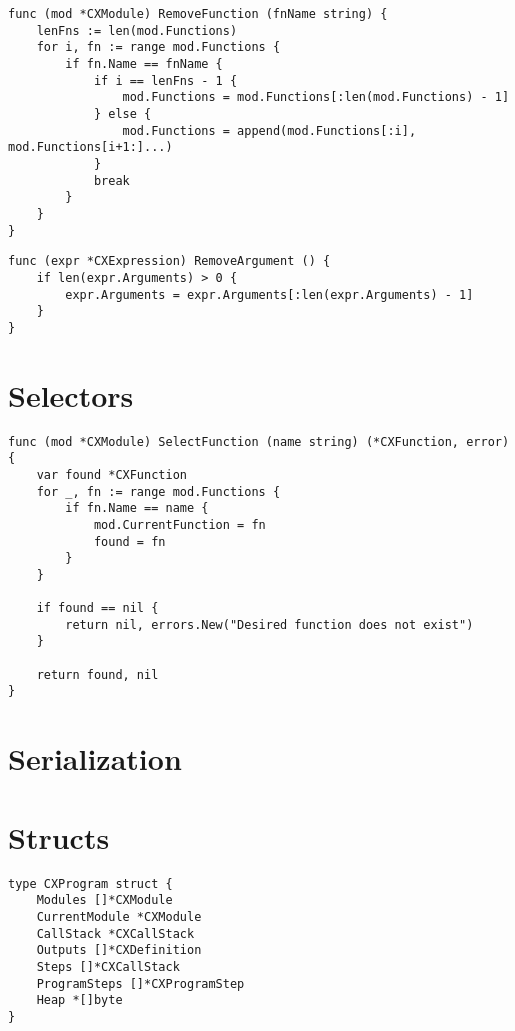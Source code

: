 \begin{lstlisting}[float=*, caption=Example of a Remover]
func (mod *CXModule) RemoveFunction (fnName string) {
	lenFns := len(mod.Functions)
	for i, fn := range mod.Functions {
		if fn.Name == fnName {
			if i == lenFns - 1 {
				mod.Functions = mod.Functions[:len(mod.Functions) - 1]
			} else {
				mod.Functions = append(mod.Functions[:i], mod.Functions[i+1:]...)
			}
			break
		}
	}
}
\end{lstlisting}

\begin{lstlisting}[float=*, caption=Example of a Remover]
func (expr *CXExpression) RemoveArgument () {
	if len(expr.Arguments) > 0 {
		expr.Arguments = expr.Arguments[:len(expr.Arguments) - 1]
	}
}
\end{lstlisting}

\section{Selectors}
\label{implementation-selectors}

\begin{lstlisting}[float=*, caption=Example of a Getter]
func (mod *CXModule) SelectFunction (name string) (*CXFunction, error) {
	var found *CXFunction
	for _, fn := range mod.Functions {
		if fn.Name == name {
			mod.CurrentFunction = fn
			found = fn
		}
	}

	if found == nil {
		return nil, errors.New("Desired function does not exist")
	}

	return found, nil
}
\end{lstlisting}

\section{Serialization}
\label{implementation-serialization}



\section{Structs}
\label{implementation-structs}

\begin{lstlisting}[float=*, caption=Example of a Struct]
type CXProgram struct {
	Modules []*CXModule
	CurrentModule *CXModule
	CallStack *CXCallStack
	Outputs []*CXDefinition
	Steps []*CXCallStack
	ProgramSteps []*CXProgramStep
	Heap *[]byte
}
\end{lstlisting}
